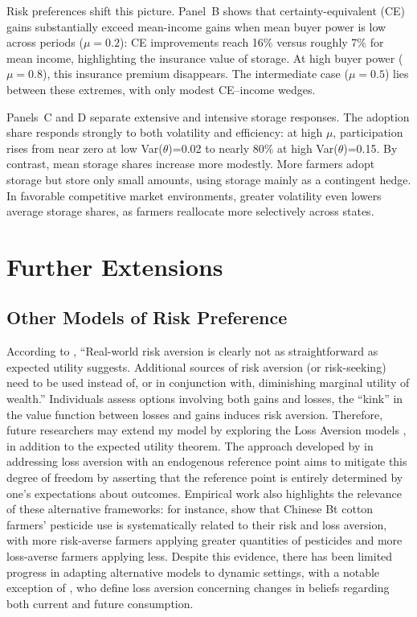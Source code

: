 Risk preferences shift this picture. Panel~B shows that certainty-equivalent (CE) gains substantially exceed mean-income gains when mean buyer power is low across periods ($\mu=0.2$): CE improvements reach 16\% versus roughly 7\% for mean income, highlighting the insurance value of storage. At high buyer power ($\mu=0.8$), this insurance premium disappears. The intermediate case ($\mu=0.5$) lies between these extremes, with only modest CE–income wedges.

Panels~C and D separate extensive and intensive storage responses. The adoption share responds strongly to both volatility and efficiency: at high $\mu$, participation rises from near zero at low Var($\theta$)=0.02 to nearly 80\% at high Var($\theta$)=0.15. By contrast, mean storage shares increase more modestly. More farmers adopt storage but store only small amounts, using storage mainly as a contingent hedge. In favorable competitive market environments, greater volatility even lowers average storage shares, as farmers reallocate more selectively across states.





\section{Further Extensions}

\subsection{Other Models of Risk Preference}
\noindent According to \cite{o2018modeling}, ``Real-world risk aversion is clearly not as straightforward as expected utility suggests. Additional sources of risk aversion (or risk-seeking) need to be used instead of, or in conjunction with, diminishing marginal utility of wealth.'' Individuals assess options involving both gains and losses, the ``kink'' in the value function between losses and gains induces risk aversion. Therefore, future researchers may extend my model by exploring the Loss Aversion models \citep{kahneman1979prospect}, in addition to the expected utility theorem. The approach developed by \cite{kHoszegi2006model, kHoszegi2007reference, kHoszegi2009reference} in addressing loss aversion with an endogenous reference point aims to mitigate this degree of freedom by asserting that the reference point is entirely determined by one's expectations about outcomes. Empirical work also highlights the relevance of these alternative frameworks: for instance, \cite{liu2013risk} show that Chinese Bt cotton farmers' pesticide use is systematically related to their risk and loss aversion, with more risk-averse farmers applying greater quantities of pesticides and more loss-averse farmers applying less. Despite this evidence, there has been limited progress in adapting alternative models to dynamic settings, with a notable exception of \cite{kHoszegi2009reference}, who define loss aversion concerning changes in beliefs regarding both current and future consumption.



